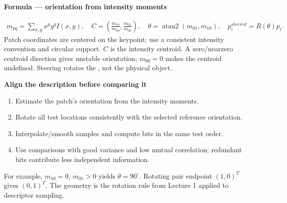\documentclass[letterpaper,11pt,english,openany,oneside]{jupyterBook}
\begin{document}
\begin{TextbookBox}
\textbf{Formula — orientation from intensity moments}\par\smallskip
\begin{equation}\label{equation:lectures/lecture05/descriptors:eq-lec05-orientation}
\begin{split}m_{pq}=\sum_{x,y}x^py^qI(x,y),\quad
C=\left(\frac{m_{10}}{m_{00}},\frac{m_{01}}{m_{00}}\right),\quad
\theta=\operatorname{atan2}(m_{01},m_{10}),\quad
p_i^{steered}=R(\theta)p_i.\end{split}
\end{equation}
\sphinxAtStartPar
Patch coordinates are centered on the keypoint; use a consistent intensity convention and circular support. \(C\) is the intensity centroid. A zero/near\sphinxhyphen{}zero centroid direction gives unstable orientation; \(m_{00}=0\) makes the centroid undefined. Steering rotates the , not the physical object.

\end{TextbookBox}

\begin{TextbookBox}
\textbf{Align the description before comparing it}\par\smallskip
\begin{enumerate}
%
\item {}
\sphinxAtStartPar
Estimate the patch’s orientation from the intensity moments.

\item {}
\sphinxAtStartPar
Rotate all test locations consistently with the selected reference orientation.

\item {}
\sphinxAtStartPar
Interpolate/smooth samples and compute bits in the same test order.

\item {}
\sphinxAtStartPar
Use comparisons with good variance and low mutual correlation; redundant bits contribute less independent information.

\end{enumerate}

\end{TextbookBox}

\sphinxAtStartPar
For example, \(m_{10}=0\), \(m_{01}>0\) yields \(\theta=90^\circ\). Rotating pair endpoint \((1,0)^T\) gives \((0,1)^T\). The geometry is the rotation rule from Lecture 1 applied to descriptor sampling.
\end{document}
